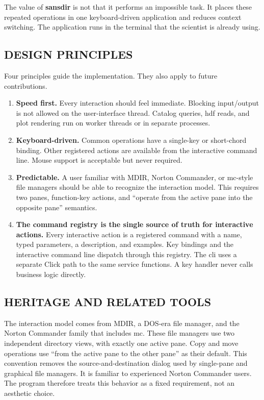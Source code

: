 \documentclass[tm]{ornltm}
\begin{document}
The value of \textbf{sansdir} is not that it performs an impossible task. It
places these repeated operations in one keyboard-driven application and reduces
context switching. The application runs in the terminal that the scientist is
already using.

\subsection{DESIGN PRINCIPLES}
\label{sec:principles}

Four principles guide the implementation. They also apply to future
contributions.

\begin{enumerate}
  \item \textbf{Speed first.} Every interaction should feel immediate. Blocking
    input/output is not allowed on the user-interface thread. Catalog queries,
    \ac{hdf} reads, and plot rendering run on worker threads or in separate
    processes.
  \item \textbf{Keyboard-driven.} Common operations have a single-key or
    short-chord binding. Other registered actions are available from the
    interactive command line. Mouse support is acceptable but never required.
  \item \textbf{Predictable.} A user familiar with MDIR, Norton Commander, or
    \ac{mc}-style file managers \autocite{midnightcommander} should be able to
    recognize the interaction model. This requires two panes, function-key
    actions, and ``operate from the active pane into the opposite pane''
    semantics.
  \item \textbf{The command registry is the single source of truth for
    interactive actions.} Every interactive action is a registered command with
    a name, typed parameters, a description, and examples. Key bindings and the
    interactive command line dispatch through this registry. The \ac{cli} uses
    a separate Click path to the same service functions. A key handler never
    calls business logic directly.
\end{enumerate}

\subsection{HERITAGE AND RELATED TOOLS}

The interaction model comes from MDIR, a DOS-era file manager, and the Norton
Commander family that includes \ac{mc}. These file managers use two independent
directory views, with exactly one active pane. Copy and move operations use
``from the active pane to the other pane'' as their default. This convention
removes the source-and-destination dialog used by single-pane and graphical file
managers. It is familiar to experienced Norton Commander users. The program
therefore treats this behavior as a fixed requirement, not an aesthetic choice.
\end{document}
